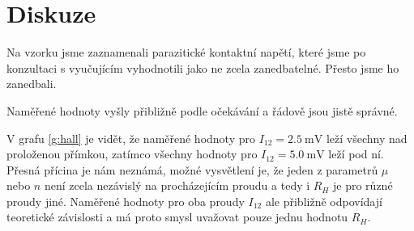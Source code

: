 \section*{Diskuze}
Na vzorku jsme zaznamenali parazitické kontaktní napětí, které jsme po konzultaci s vyučujícím vyhodnotili jako ne zcela zanedbatelné. Přesto jsme ho zanedbali.

Naměřené hodnoty vyšly přibližně podle očekávání a řádově jsou jistě správné.

V grafu \ref{g:hall} je vidět, že naměřené hodnoty pro $I_{12}=\SI{2.5}{\milli\volt}$ leží všechny nad proloženou přímkou, zatímco všechny hodnoty pro $I_{12}=\SI{5.0}{\milli\volt}$ leží pod ní.
Přesná přícina je nám neznámá, možné vysvětlení je, že jeden z parametrů $\mu$ nebo $n$ není zcela nezávislý na procházejícím proudu a tedy i $R_H$ je pro různé proudy jiné.
Naměřené hodnoty pro oba proudy $I_{12}$ ale přibližně odpovídají teoretické závislosti a má proto smysl uvažovat pouze jednu hodnotu $R_H$.